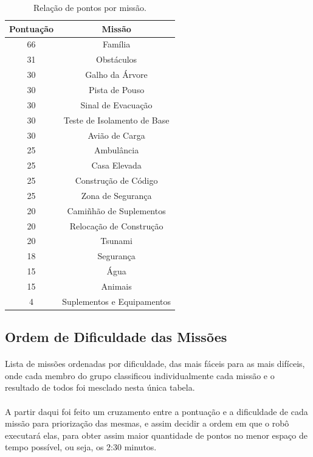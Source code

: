 \documentclass{article}
\begin{document}
		\begin{table}[h!]
			\begin{center}
				\begin{tabular}{cc}
					\toprule
						Pontuação & Missão\\
					\midrule
						66 & Família\\
						31 & Obstáculos\\
						30 & Galho da Árvore\\
						30 & Pista de Pouso\\
						30 & Sinal de Evacuação\\
						30 & Teste de Isolamento de Base\\
						30 & Avião de Carga\\
						25 & Ambulância\\
						25 & Casa Elevada\\
						25 & Construção de Código\\
						25 & Zona de Segurança\\
						20 & Camiñhão de Suplementos\\
						20 & Relocação de Construção\\
						20 & Tsunami\\
						18 & Segurança\\
						15 & Água\\
						15 & Animais\\
						4 & Suplementos e Equipamentos\\
					\bottomrule
				\end{tabular}
				\caption{Relação de pontos por missão.}
				\label{tab:table_pontuation}
			\end{center}
		\end{table}

	\subsection{Ordem de Dificuldade das Missões}
		\paragraph{}
			Lista de missões ordenadas por dificuldade, das mais fáceis para as 
			mais difíceis, onde cada membro do grupo classificou individualmente 
			cada missão e o resultado de todos foi mesclado nesta única tabela.
		\paragraph{}
			A partir daqui foi feito um cruzamento entre a pontuação e a 
			dificuldade de cada missão para priorização das mesmas, e assim 
			decidir a ordem em que o robô executará elas, para obter assim maior 
			quantidade de pontos no menor espaço de tempo possível, ou seja, os 
			2:30 minutos.
\end{document}
